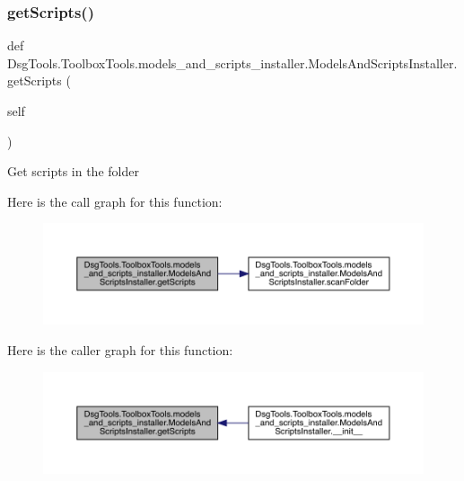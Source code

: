 \subsubsection{\texorpdfstring{get\+Scripts()}{getScripts()}}
{\footnotesize\ttfamily def Dsg\+Tools.\+Toolbox\+Tools.\+models\+\_\+and\+\_\+scripts\+\_\+installer.\+Models\+And\+Scripts\+Installer.\+get\+Scripts (\begin{DoxyParamCaption}\item[{}]{self }\end{DoxyParamCaption})}

\begin{DoxyVerb}Get scripts in the folder
\end{DoxyVerb}
 Here is the call graph for this function\+:
\nopagebreak
\begin{figure}[H]
\begin{center}
\leavevmode
\includegraphics[width=350pt]{class_dsg_tools_1_1_toolbox_tools_1_1models__and__scripts__installer_1_1_models_and_scripts_installer_a482ce617c048b98130cd7b5c827eab06_cgraph}
\end{center}
\end{figure}
Here is the caller graph for this function\+:
\nopagebreak
\begin{figure}[H]
\begin{center}
\leavevmode
\includegraphics[width=350pt]{class_dsg_tools_1_1_toolbox_tools_1_1models__and__scripts__installer_1_1_models_and_scripts_installer_a482ce617c048b98130cd7b5c827eab06_icgraph}
\end{center}
\end{figure}
\mbox{\label{class_dsg_tools_1_1_toolbox_tools_1_1models__and__scripts__installer_1_1_models_and_scripts_installer_a97fded3f1030267541e352808d1f4d21}} 
